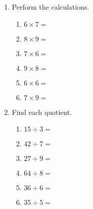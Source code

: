\documentclass[12pt, twoside]{article}
\begin{document}
\begin{enumerate}
  \item Perform the calculations.
  \begin{multicols}{2}
    \begin{enumerate}[itemsep=1cm]
        \item $6 \times 7 =$
        \item $8 \times 9 =$
        \item $7 \times 6 =$
        \item $9 \times 8 =$
        \item $6 \times 6 =$
        \item $7 \times 9 =$
    \end{enumerate}
  \end{multicols} \vspace{1cm}

\item Find each quotient.
  \begin{multicols}{2}
    \begin{enumerate}[itemsep=1cm]
        \item $15 \div 3 =$
        \item $42 \div 7 =$
        \item $27 \div 9 =$
        \item $64 \div 8 =$
        \item $36 \div 6 =$
        \item $35 \div 5 =$
    \end{enumerate}
  \end{multicols}


\end{enumerate}
\end{document}
